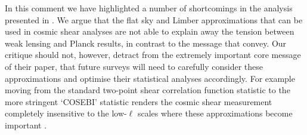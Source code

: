 In this comment we have highlighted a number of shortcomings in the analysis presented in \cite{kitching/etal:2016}.  We argue that the flat sky and Limber approximations that can be used in cosmic shear analyses are not able to explain away the tension between weak lensing and Planck results, in contrast to the message that \cite{kitching/etal:2016} convey.  Our critique should not, however, detract from the extremely important core message of their paper, that future surveys will need to carefully consider these approximations and optimise their statistical analyses accordingly.  For example moving from the standard two-point shear correlation function statistic to the more stringent `COSEBI' statistic renders the cosmic shear measurement completely insensitive to the low-$\ell$ scales where these approximations become important \citep{schneider/etal:2010}.  
